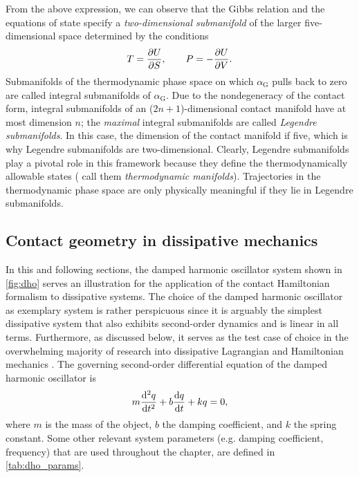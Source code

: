 From the above expression, we can observe that the Gibbs relation and the equations of state specify a \emph{two-dimensional submanifold} of the larger five-dimensional space determined by the conditions
\begin{equation}
    T = \pdv{U}{S}, \qquad P = -\pdv{U}{V}. 
\end{equation}
Submanifolds of the thermodynamic phase space on which $\alpha_\text{G}$ pulls back to zero are called integral submanifolds of $\alpha_\text{G}$. Due to the nondegeneracy of the contact form, integral submanifolds of an ($2n+1$)-dimensional contact manifold have at most dimension $n$; the \emph{maximal} integral submanifolds are called \emph{Legendre submanifolds}. In this case, the dimension of the contact manifold if five, which is why Legendre submanifolds are two-dimensional.
Clearly, Legendre submanifolds play a pivotal role in this framework because they define the thermodynamically allowable states (\citet{Balian2001} call them \emph{thermodynamic manifolds}). Trajectories in the thermodynamic phase space are only physically meaningful if they lie in Legendre submanifolds.

\subsection{Contact geometry in dissipative mechanics}
In this and following sections, the damped harmonic oscillator system shown in \cref{fig:dho} serves an illustration for the application of the contact Hamiltonian formalism to dissipative systems. The choice of the damped harmonic oscillator as exemplary system is rather perspicuous since it is arguably the simplest dissipative system that also exhibits second-order dynamics and is linear in all terms. Furthermore, as discussed below, it serves as the test case of choice in the overwhelming majority of research into dissipative Lagrangian and Hamiltonian mechanics \cite{Dekker1981,Hutters2020}. The governing second-order differential equation of the damped harmonic oscillator is
\begin{equation}  
    m\dv[2]{q}{t} + b\dv{q}{t} + kq = 0,
    \label{eq:dho_eom}
\end{equation}
where $m$ is the mass of the object, $b$ the damping coefficient, and $k$ the spring constant.  Some other relevant system parameters (e.g. damping coefficient, frequency) that are used throughout the chapter, are defined in \cref{tab:dho_params}. 

